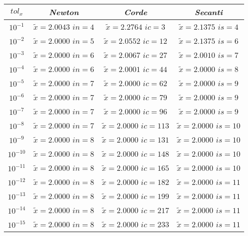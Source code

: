 \begin{center}
	\begin{tabular}{|c|c|c|c|}
		\hline
			$tol_x$ & \textit{Newton} & \textit{Corde} & \textit{Secanti} \\
		\hline
			$10^{-1}$ & $\tilde{x} = 2.0043$ \quad $in = 4$ & $\tilde{x} = 2.2764$ \quad $ic = 3$ & $\tilde{x} = 2.1375$ \quad $is = 4$\\
			$10^{-2}$ & $\tilde{x} = 2.0000$ \quad $in = 5$ & $\tilde{x} = 2.0552$ \quad $ic = 12$ & $\tilde{x} = 2.1375$ \quad $is = 6$\\
			$10^{-3}$ & $\tilde{x} = 2.0000$ \quad $in = 6$ & $\tilde{x} = 2.0067$ \quad $ic = 27$ & $\tilde{x} = 2.0010$ \quad $is = 7$\\
			$10^{-4}$ & $\tilde{x} = 2.0000$ \quad $in = 6$ & $\tilde{x} = 2.0001$ \quad $ic = 44$ & $\tilde{x} = 2.0000$ \quad $is = 8$\\
			$10^{-5}$ & $\tilde{x} = 2.0000$ \quad $in = 7$ & $\tilde{x} = 2.0000$ \quad $ic = 62$ & $\tilde{x} = 2.0000$ \quad $is = 9$\\
			$10^{-6}$ & $\tilde{x} = 2.0000$ \quad $in = 7$ & $\tilde{x} = 2.0000$ \quad $ic = 79$ & $\tilde{x} = 2.0000$ \quad $is = 9$\\
			$10^{-7}$ & $\tilde{x} = 2.0000$ \quad $in = 7$ & $\tilde{x} = 2.0000$ \quad $ic = 96$ & $\tilde{x} = 2.0000$ \quad $is = 9$\\
			$10^{-8}$ & $\tilde{x} = 2.0000$ \quad $in = 7$ & $\tilde{x} = 2.0000$ \quad $ic = 113$ & $\tilde{x} = 2.0000$ \quad $is = 10$\\
			$10^{-9}$ & $\tilde{x} = 2.0000$ \quad $in = 8$ & $\tilde{x} = 2.0000$ \quad $ic = 131$ & $\tilde{x} = 2.0000$ \quad $is = 10$\\
			$10^{-10}$ & $\tilde{x} = 2.0000$ \quad $in = 8$ & $\tilde{x} = 2.0000$ \quad $ic = 148$ & $\tilde{x} = 2.0000$ \quad $is = 10$\\
			$10^{-11}$ & $\tilde{x} = 2.0000$ \quad $in = 8$ & $\tilde{x} = 2.0000$ \quad $ic = 165$ & $\tilde{x} = 2.0000$ \quad $is = 10$\\
			$10^{-12}$ & $\tilde{x} = 2.0000$ \quad $in = 8$ & $\tilde{x} = 2.0000$ \quad $ic = 182$ & $\tilde{x} = 2.0000$ \quad $is = 11$\\
			$10^{-13}$ & $\tilde{x} = 2.0000$ \quad $in = 8$ & $\tilde{x} = 2.0000$ \quad $ic = 199$ & $\tilde{x} = 2.0000$ \quad $is = 11$\\
			$10^{-14}$ & $\tilde{x} = 2.0000$ \quad $in = 8$ & $\tilde{x} = 2.0000$ \quad $ic = 217$ & $\tilde{x} = 2.0000$ \quad $is = 11$\\
			$10^{-15}$ & $\tilde{x} = 2.0000$ \quad $in = 8$ & $\tilde{x} = 2.0000$ \quad $ic = 233$ & $\tilde{x} = 2.0000$ \quad $is = 11$\\
		\hline
	\end{tabular}
\end{center}
